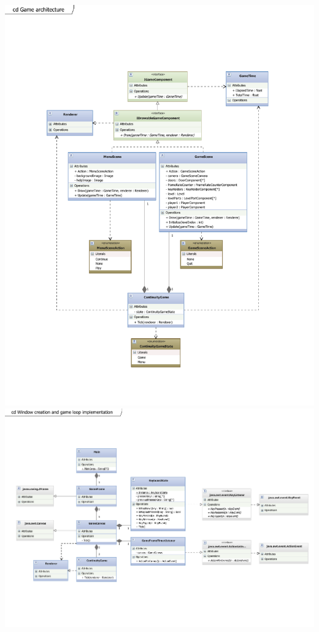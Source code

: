 \begin{center}
\includegraphics[scale=0.7]{GameArchitecture.pdf}
\newpage
\includegraphics[scale=0.7,angle=90]{Main.pdf}
\newpage

\end{center}
